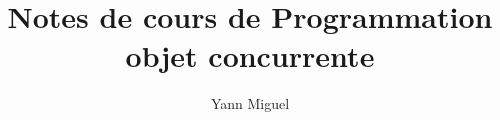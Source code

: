 \documentclass[12pt, a4paper]{article}
\title{Notes de cours de Programmation objet concurrente}
\author{Yann Miguel}
\begin{document}
\ttfamily
\maketitle
\tableofcontents
\newpage





\end{document}
